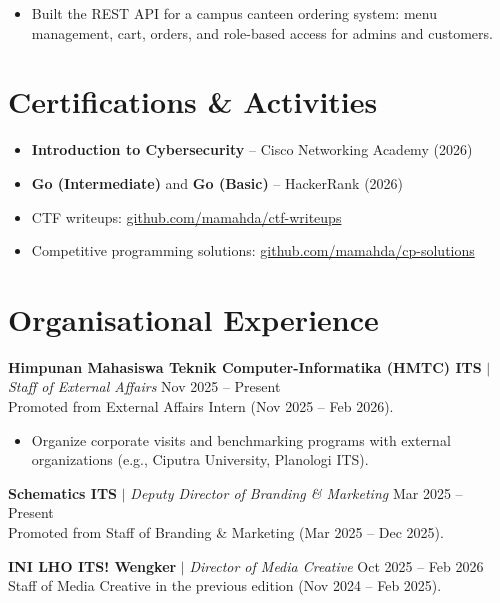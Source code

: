 \vspace{2pt}

\begin{itemize}
    \item Built the REST API for a campus canteen ordering system: menu management, cart, orders, and role-based access for admins and customers.
\end{itemize}

\section{Certifications \& Activities}

\begin{itemize}
    \item \textbf{Introduction to Cybersecurity} -- Cisco Networking Academy (2026)
    \item \textbf{Go (Intermediate)} and \textbf{Go (Basic)} -- HackerRank (2026)
    \item CTF writeups: \href{https://github.com/mamahda/ctf-writeups}{github.com/mamahda/ctf-writeups}
    \item Competitive programming solutions: \href{https://github.com/mamahda/cp-solutions}{github.com/mamahda/cp-solutions}
\end{itemize}

\section{Organisational Experience}

\textbf{Himpunan Mahasiswa Teknik Computer-Informatika (HMTC) ITS} $|$ \textit{Staff of External Affairs} \hfill Nov 2025 -- Present \\
{\color{gray}\small Promoted from External Affairs Intern (Nov 2025 -- Feb 2026).}
\begin{itemize}
    \item Organize corporate visits and benchmarking programs with external organizations (e.g., Ciputra University, Planologi ITS).
\end{itemize}

\vspace{2pt}

\textbf{Schematics ITS} $|$ \textit{Deputy Director of Branding \& Marketing} \hfill Mar 2025 -- Present \\
{\color{gray}\small Promoted from Staff of Branding \& Marketing (Mar 2025 -- Dec 2025).}

\vspace{2pt}

\textbf{INI LHO ITS! Wengker} $|$ \textit{Director of Media Creative} \hfill Oct 2025 -- Feb 2026 \\
{\color{gray}\small Staff of Media Creative in the previous edition (Nov 2024 -- Feb 2025).}


